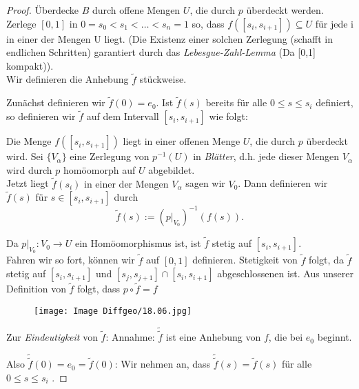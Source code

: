 \documentclass[fleqn, 12pt, letterpaper]{article}
\begin{document}
\begin{proof}
Überdecke \( B \) durch offene Mengen \( U \), die durch \( p \) überdeckt werden. Zerlege \( [0,1] \) in \( 0 = s_0 < s_1 < \dots < s_n = 1 \) so, dass \( f([s_i, s_{i+1}]) \subseteq U \) für jede i in einer der Mengen U liegt. (Die Existenz einer solchen Zerlegung (schafft in endlichen Schritten) garantiert durch das \emph{Lebesgue-Zahl-Lemma} (Da [0,1] kompakt)).\\

Wir definieren die Anhebung \( \tilde{f} \) stückweise.

Zunächst definieren wir \( \tilde{f}(0) = e_0 \). Ist \( \tilde{f}(s) \) bereits für alle \( 0 \le s \le s_i \) definiert, so definieren wir \( \tilde{f} \) auf dem Intervall \( [s_i, s_{i+1}] \) wie folgt:

Die Menge \( f([s_i, s_{i+1}]) \) liegt in einer offenen Menge \( U \), die durch \( p \) überdeckt wird. Sei \( \{ V_\alpha \} \) eine Zerlegung von \( p^{-1}(U) \) in \emph{Blätter}, d.h. jede dieser Mengen \( V_\alpha \) wird durch \( p \) homöomorph auf \( U \) abgebildet. \\

Jetzt liegt \( \tilde{f}(s_i) \text{ in einer der Mengen } V_{\alpha} \) sagen wir $V_0$. Dann definieren wir \( \tilde{f}(s) \) für \( s \in [s_i, s_{i+1}] \) durch
\[
\tilde{f}(s) := (p|_{V_{0}})^{-1}(f(s)).
\]

Da \( p|_{V_0} : V_0 \to U \) ein Homöomorphismus ist, ist \( \tilde{f} \) stetig auf \( [s_i, s_{i+1}] \). \\

Fahren wir so fort, können wir \( \tilde{f} \) auf \( [0,1] \) definieren. Stetigkeit von \( \tilde{f} \) folgt, da \( \tilde{f} \) stetig auf $[s_i,s_{i+1}]$ und $[s_j,s_{j+1}]\cap[s_i,s_{i+1}]$ abgeschlossenen ist. Aus unserer Definition von \( \tilde{f} \) folgt, dass $p\circ\tilde{f}=f$ \\

 \begin{figure}[H]
    \centering
    \texttt{[image: Image Diffgeo/18.06.jpg]}
 \end{figure}

Zur \emph{Eindeutigkeit} von \( \tilde{f} \): Annahme: \( \tilde{\tilde{f}} \) ist eine Anhebung von \( f \), die bei \( e_0 \) beginnt.

Also $\tilde{\tilde{f}}(0)=e_0=\tilde{f}(0)$: Wir nehmen an, dass \( \tilde{\tilde{f}}(s)=\tilde{f}(s) \) für alle \( 0 \le s \le s_i \) .


\end{proof}
\end{document}

